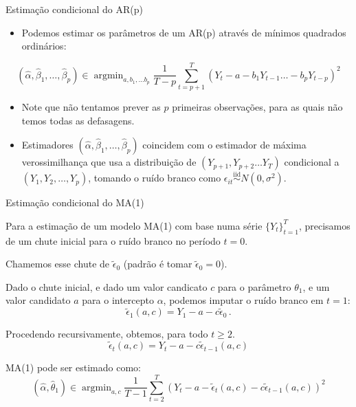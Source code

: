\documentclass[11pt]{beamer}
\newenvironment{halfwideitemize}{\itemize\addtolength{\itemsep}{0.5em}}{\enditemize}
\begin{document}
\begin{frame}{Estimação condicional do AR(p)}
	\begin{itemize}
		\item Podemos estimar os parâmetros de um AR(p) através de mínimos quadrados ordinários:
	\end{itemize}
		\begin{equation*}
			(\hat\alpha,\hat{\beta}_1,\ldots, \hat\beta_p) \in \operatorname{argmin}_{a,b_1,\ldots b_p} \frac{1}{T-p}\sum_{t=p+1}^{T}(Y_{t}- a - b_1 Y_{t-1} \ldots - b_p Y_{t-p})^2
		\end{equation*}
				\begin{itemize}
		\item Note que não tentamos prever as $p$ primeiras observações, para as quais não temos todas as defasagens.
		\item Estimadores $	(\hat\alpha,\hat{\beta}_1,\ldots, \hat\beta_p) $ coincidem com o estimador de máxima verossimilhança que usa a distribuição de $(Y_{p+1},Y_{p+2}\ldots Y_{T})$ {\color{blue}condicional} a $(Y_1,Y_2,\ldots,Y_p)$, tomando o ruído branco como $\epsilon_{it}\overset{\text{iid}}{\sim} N(0,\sigma^2)$.
		 \end{itemize}
\end{frame}
\begin{frame}{Estimação condicional do MA(1)}
	\begin{halfwideitemize}
		\item Para a estimação de um modelo MA(1) com base numa série $\{Y_{t}\}_{t=1}^T$, precisamos de um chute inicial para o ruído branco no período $t=0$.
		\item Chamemos esse chute de $\tilde{\epsilon}_0$ (padrão é tomar  $\tilde{\epsilon}_0 = 0$).

		\item Dado o chute inicial, e dado um valor candicato $c$ para o parâmetro $\theta_1$, e um valor candidato $a$ para o intercepto $\alpha$, podemos imputar o ruído branco em $t=1$:
		$$ \tilde{\epsilon}_{1}(a,c) = Y_1 - a - c \tilde{\epsilon}_0 \, .$$
		\item Procedendo recursivamente, obtemos, para todo $t\geq 2$.
		$$ \tilde{\epsilon}_{t}(a,c) = Y_t - a - c \tilde{\epsilon}_{t-1}(a,c)$$
		\item MA(1) pode ser estimado como:
		\begin{equation*}
			(\hat \alpha, \hat \theta_1) \in \operatorname{argmin}_{a, c}\frac{1}{T-1}\sum_{t=2}^{T}(Y_t -a - \tilde{\epsilon}_t(a,c) - c\tilde{\epsilon}_{t-1}(a,c))^2
		\end{equation*}
	\end{halfwideitemize}
\end{frame}
\end{document}
